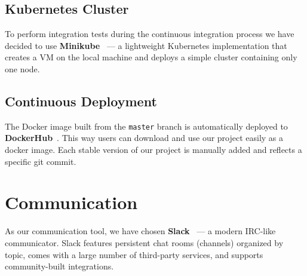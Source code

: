 \subsection{Kubernetes Cluster}
To perform integration tests during the continuous integration process we 
have decided to use \textbf{Minikube}~\cite{minikube} --- a lightweight
Kubernetes implementation that creates a VM on the local machine and deploys 
a simple cluster containing only one node.

\subsection{Continuous Deployment}
The Docker image built from the \texttt{master} branch is automatically 
deployed to \textbf{DockerHub}~\cite{docker}. This way users can download
and use our project easily as a docker image. Each stable version of our 
project is manually added and reflects a specific git commit.

\section{Communication}
As our communication tool, we have chosen \textbf{Slack}~\cite{slack} --- 
a modern IRC-like communicator. Slack features persistent chat rooms
(channels) organized by topic, comes with a large number of third-party 
services, and supports community-built integrations.
